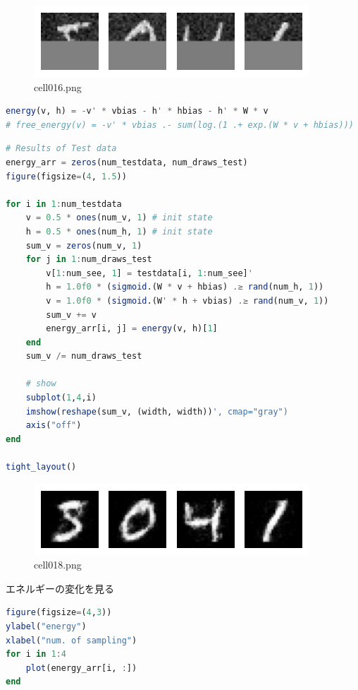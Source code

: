 \begin{figure}[ht]
	\centering
	\includegraphics[scale=0.8, max width=\linewidth]{./fig/energy-based-model/boltzmann-machine/cell016.png}
	\caption{cell016.png}
	\label{cell016.png}
\end{figure}
\begin{lstlisting}[language=julia]
energy(v, h) = -v' * vbias - h' * hbias - h' * W * v
# free_energy(v) = -v' * vbias .- sum(log.(1 .+ exp.(W * v + hbias)))
\end{lstlisting}
\begin{lstlisting}[language=julia]
# Results of Test data
energy_arr = zeros(num_testdata, num_draws_test)
figure(figsize=(4, 1.5))

for i in 1:num_testdata
    v = 0.5 * ones(num_v, 1) # init state
    h = 0.5 * ones(num_h, 1) # init state
    sum_v = zeros(num_v, 1)
    for j in 1:num_draws_test
        v[1:num_see, 1] = testdata[i, 1:num_see]'
        h = 1.0f0 * (sigmoid.(W * v + hbias) .≥ rand(num_h, 1))
        v = 1.0f0 * (sigmoid.(W' * h + vbias) .≥ rand(num_v, 1))
        sum_v += v
        energy_arr[i, j] = energy(v, h)[1]
    end
    sum_v /= num_draws_test
    
    # show
    subplot(1,4,i)
    imshow(reshape(sum_v, (width, width))', cmap="gray")
    axis("off")
end

tight_layout()
\end{lstlisting}
\begin{figure}[ht]
	\centering
	\includegraphics[scale=0.8, max width=\linewidth]{./fig/energy-based-model/boltzmann-machine/cell018.png}
	\caption{cell018.png}
	\label{cell018.png}
\end{figure}
エネルギーの変化を見る
\begin{lstlisting}[language=julia]
figure(figsize=(4,3))
ylabel("energy")
xlabel("num. of sampling")
for i in 1:4
    plot(energy_arr[i, :])
end
\end{lstlisting}
